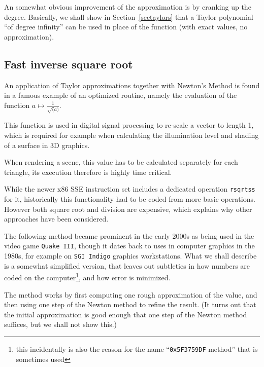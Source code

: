 An somewhat obvious improvement of the approximation is by cranking up the
degree. Basically, we shall show in Section~\ref{sectaylors}
that a Taylor polynomial ``of degree
infinity'' can be used in place of the function (with exact values, no
approximation).

\subsection{Fast inverse square root}

An application of Taylor approximations together with Newton's Method 
is found in a famous example of an
optimized routine, namely the evaluation of the function $a\mapsto
\frac{1}{\sqrt(a)}$.

This function is used in digital signal processing to re-scale a vector to
length 1, which is required for example when calculating the illumination
level and shading of a surface in 3D graphics. 

When rendering a scene, this value has to be calculated separately for each
triangle, its execution therefore is highly time critical.

While the newer x86 SSE instruction set includes a dedicated operation
\texttt{rsqrtss} for it, historically this functionality had to be coded from
more basic operations. However both square root and division are expensive,
which explains why other approaches have been considered.

The following method became prominent in the early 2000s as being used in
the video game \texttt{Quake III}, though it dates back to uses in computer
graphics in the 1980s, for example on \texttt{SGI Indigo} graphics
workstations. What we shall describe is a somewhat simplified version, that
leaves out subtleties in how numbers are coded on the computer\footnote{this
incidentally is also the
reason for the name ``\texttt{0x5F3759DF} method'' that is sometimes used},
and how error is minimized.
\medskip

The method works by first computing one rough approximation of the value,
and then using one step of the Newton method to refine the result. (It turns
out that the initial approximation is good enough that one step of the
Newton method suffices, but we shall not show this.)
\smallskip

